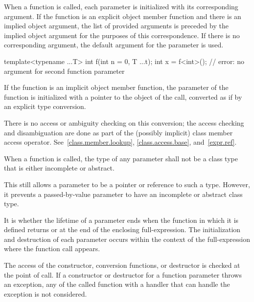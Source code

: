 \pnum
{}%
%
%
When a function is called, each parameter is
initialized with
its corresponding argument.
If the function is an explicit object member function and
there is an implied object argument,
the list of provided arguments is preceded by the implied object argument
for the purposes of this correspondence.
If there is no corresponding argument,
the default argument for the parameter is used.
\begin{example}
\begin{codeblock}
template<typename ...T> int f(int n = 0, T ...t);
int x = f<int>();               // error: no argument for second function parameter
\end{codeblock}
\end{example}
If the function is an implicit object member
function, the  parameter of the function
is initialized with a pointer to the object of the call, converted
as if by an explicit type conversion.
\begin{note}
There is no access or ambiguity checking on this conversion; the access
checking and disambiguation are done as part of the (possibly implicit)
class member access operator.
See~\ref{class.member.lookup}, \ref{class.access.base},
and~\ref{expr.ref}.
\end{note}
When a function is called, the type of any parameter
shall not be a class type that is either incomplete or abstract.
\begin{note}
This still allows a parameter to be a pointer or reference to such
a type. However, it prevents a passed-by-value parameter
to have an incomplete or abstract class type.
\end{note}
It is  whether the
lifetime of a parameter ends when the function in which it is defined
returns or at the end of the enclosing full-expression.
The initialization and destruction of each parameter occurs
within the context of the full-expression
where the function call appears.
\begin{example}
The access of the
constructor, conversion functions, or destructor is
checked at the point of call. If a constructor
or destructor for a function parameter throws an exception,
any 
of the called function
with a handler that can handle the exception
is not considered.
\end{example}


